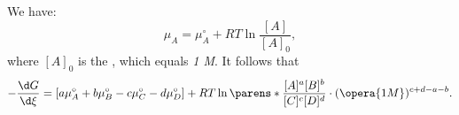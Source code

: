 \begin{fact}
	We have: \[
		\mu_A = \mu_A^\circ + RT \ln \frac{[A]}{[A]_0},
	\]
	where $[A]_0$ is the , which equals \emph{1 M}.
	It follows that \[
		-\frac{\d G}{\d \xi} = [a \mu_A^\circ + b\mu_B^\circ - c\mu_C^\circ - d\mu_D^\circ] + RT \ln \parens*{\frac{[A]^a[B]^b}{[C]^c[D]^d} \cdot (\opera{1 M})^{c+d-a-b}}.
	\]
	
\end{fact}
